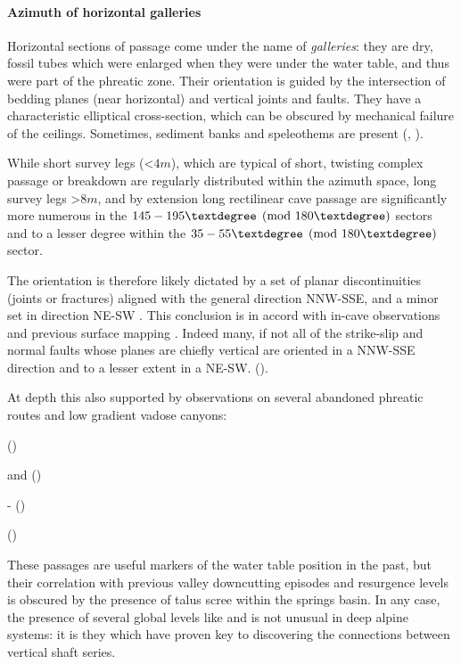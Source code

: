  \paragraph{Azimuth of horizontal galleries}
 Horizontal sections of passage come under the name of \emph{galleries}: they are dry, fossil tubes which were enlarged when they were under the water table, and thus were part of the phreatic zone. Their orientation is guided by the intersection of bedding planes (near horizontal) and vertical joints and faults. They have a characteristic elliptical cross-section, which can be obscured by mechanical failure of the ceilings. Sometimes, sediment banks and speleothems are present (, ).

While short survey legs (<$4m$), which are typical of short, twisting complex passage or breakdown are regularly distributed within the azimuth space, long survey legs >$8m$, and by extension long rectilinear cave passage are significantly more numerous in the $145-195\textdegree  \pmod{180\textdegree}$  sectors and to a lesser degree within the $35-55\textdegree   \pmod{180\textdegree }$ sector.


The orientation is therefore likely dictated by a set of planar discontinuities (joints or fractures) aligned with the general direction NNW-SSE, and a minor set in direction NE-SW . This conclusion is in accord with in-cave observations \citep{hm1}  and previous surface mapping \citep{buser1986tolmavc} . Indeed many, if not all of the strike-slip and normal faults whose planes are chiefly vertical are oriented in a NNW-SSE direction and to a lesser extent in a NE-SW. ().

At depth this also supported by observations on several abandoned phreatic routes and low gradient vadose canyons:
 
\begin{citemize} 
\item {} ()
\item {} and   ()
 \item {} -  ()
 \item {} ()
 \end{citemize} 

These passages are useful markers of the water table position in the past, but their correlation with previous valley downcutting episodes and resurgence levels is obscured by the presence of talus scree within the  springs basin. In any case, the presence of several global levels like  and  is not unusual in deep alpine systems: it is they which have proven key to discovering the connections between vertical shaft series.

